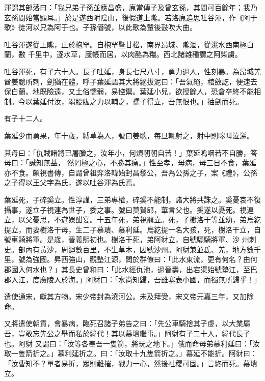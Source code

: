\begin{pinyinscope}
 渾謂其部落曰：「我兄弟子孫並應昌盛，廆當傳子及曾玄孫，其間可百餘年；我乃玄孫間始當顯耳。」於是遂西附陰山，後假道上隴。若洛廆追思吐谷渾，作《阿于歌》徒河以兄為阿于也。子孫僭號，以此歌為輦後鼓吹大曲。



 吐谷渾遂從上隴，止於枹罕。自枹罕暨甘松，南界昂城、隴涸，從洮水西南極白蘭，數
 千里中，逐水草，廬帳而居，以肉酪為糧。西北諸雜種謂之阿柴虜。



 吐谷渾死，有子六十人。長子吐延，身長七尺八寸，勇力過人，性刻暴。為昂城羌酋姜聰所刺，劍猶在體，呼子葉延語其大將絕拔泥曰：「吾氣絕，棺斂訖，便速去保白蘭。地既險遠，又土俗懦弱，易控禦。葉延小兒，欲授餘人，恐倉卒終不能相制。今以葉延付汝，竭股肱之力以輔之，孺子得立，吾無恨也。」抽劍而死。



 有子十二人。



 葉延少而勇果，年十歲，縛草為人，號曰姜聰，每旦輒射之，射中則嗥叫泣涕。



 其母曰：「仇賊諸將已屠膾之，汝年小，何煩朝朝自苦！」葉延嗚咽若不自勝，答母曰：「誠知無益，
 然罔極之心，不勝其痛。」性至孝，母病，母三日不食，葉延亦不食。頗視書傳，自謂曾祖弈洛韓始封昌黎公，吾為公孫之子，案《禮》，公孫之子得以王父字為氏，遂以吐谷渾為氏焉。



 葉延死，子碎奚立。性淳謹，三弟專權，碎奚不能制，諸大將共誅之。奚憂哀不復攝事，遂立子視連為世子，委之事。號曰莫賀郎，華言父也。奚遂以憂死。視連立，以父憂思，不遊娛酣宴。十五年死，弟視羆立。死，子樹洛干等並幼，弟烏紇提立，而妻樹洛干母，生二子慕璝、慕利延。烏紇提一名大孩，死，樹洛干立，自號車騎將軍。是歲，晉義熙初也。樹洛干死，弟阿豺立，自號驃騎將軍、沙
 州刺史。部內有黃沙，周迴數百里，不生草木，因號沙州。阿豺兼並氐、羌，地方數千里，號為強國。昇西強山，觀墊江源，問於群僚曰：「此水東流，更有何名？由何郡國入何水也？」其長史曾和曰：「此水經仇池，過晉壽，出宕渠始號墊江，至巴郡入江，度廣陵入於海。」阿豺曰：「水尚知歸，吾雖塞表小國，而獨無所歸乎！」



 遣使通宋，獻其方物。宋少帝封為澆河公。未及拜受，宋文帝元嘉三年，又加除命。



 又將遣使朝貢，會暴病，臨死召諸子弟告之曰：「先公車騎捨其子虔，以大業屬吾，豈敢忘先公之舉而私於緯代！其以慕璝繼事。」阿豺有子二十人，緯代長子也。阿豺
 又謂曰：「汝等各奉吾一隻箭，將玩之地下。」俄而命母弟慕利延曰：「汝取一隻箭折之。」慕利延折之。曰：「汝取十九隻箭折之。」慕延不能折。阿豺曰：「汝曹知不？單者易折，眾則難摧，戮力一心，然後社稷可固。」言終而死。慕璝立。




\end{pinyinscope}
